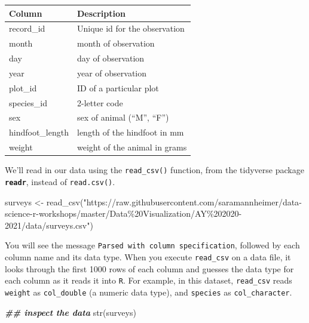 \documentclass[
]{article}
\newenvironment{Shaded}{\begin{snugshade}}{\end{snugshade}}
\newcommand{\DocumentationTok}[1]{\textcolor[rgb]{0.56,0.35,0.01}{\textbf{\textit{#1}}}}
\newcommand{\FunctionTok}[1]{\textcolor[rgb]{0.00,0.00,0.00}{#1}}
\newcommand{\NormalTok}[1]{#1}
\newcommand{\OtherTok}[1]{\textcolor[rgb]{0.56,0.35,0.01}{#1}}
\newcommand{\StringTok}[1]{\textcolor[rgb]{0.31,0.60,0.02}{#1}}
\begin{document}
\begin{longtable}[]{@{}ll@{}}
\toprule
Column & Description\tabularnewline
\midrule
\endhead
record\_id & Unique id for the observation\tabularnewline
month & month of observation\tabularnewline
day & day of observation\tabularnewline
year & year of observation\tabularnewline
plot\_id & ID of a particular plot\tabularnewline
species\_id & 2-letter code\tabularnewline
sex & sex of animal (``M'', ``F'')\tabularnewline
hindfoot\_length & length of the hindfoot in mm\tabularnewline
weight & weight of the animal in grams\tabularnewline
\bottomrule
\end{longtable}

We'll read in our data using the \texttt{read\_csv()} function, from the
tidyverse package \textbf{\texttt{readr}}, instead of
\texttt{read.csv()}.

\begin{Shaded}
\begin{Highlighting}[]
\NormalTok{surveys }\OtherTok{\textless{}{-}} \FunctionTok{read\_csv}\NormalTok{(}\StringTok{"https://raw.githubusercontent.com/saramannheimer/data{-}science{-}r{-}workshops/master/Data\%20Visualization/AY\%202020{-}2021/data/surveys.csv"}\NormalTok{)}
\end{Highlighting}
\end{Shaded}

You will see the message \texttt{Parsed\ with\ column\ specification},
followed by each column name and its data type. When you execute
\texttt{read\_csv} on a data file, it looks through the first 1000 rows
of each column and guesses the data type for each column as it reads it
into \texttt{R}. For example, in this dataset, \texttt{read\_csv} reads
\texttt{weight} as \texttt{col\_double} (a numeric data type), and
\texttt{species} as \texttt{col\_character}.

\begin{Shaded}
\begin{Highlighting}[]
\DocumentationTok{\#\# inspect the data}
\FunctionTok{str}\NormalTok{(surveys)}
\end{Highlighting}
\end{Shaded}
\end{document}
